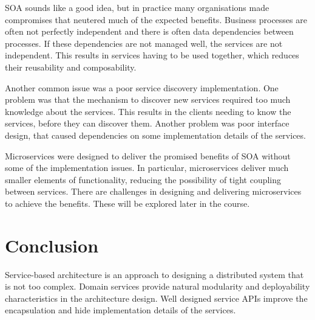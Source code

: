 SOA sounds like a good idea, but in practice many organisations made compromises that neutered much of the expected benefits.
Business processes are often not perfectly independent and there is often data dependencies between processes.
If these dependencies are not managed well, the services are not independent.
This results in services having to be used together, which reduces their reusability and composability.

Another common issue was a poor service discovery implementation.
One problem was that the mechanism to discover new services required too much knowledge about the services.
This results in the clients needing to know the services, before they can discover them.
Another problem was poor interface design, that caused dependencies on some implementation details of the services.

Microservices were designed to deliver the promised benefits of SOA without some of the implementation issues.
In particular, microservices deliver much smaller elements of functionality, reducing the possibility of tight coupling between services.
There are challenges in designing and delivering microservices to achieve the benefits.
These will be explored later in the course.


\section{Conclusion}

Service-based architecture is an approach to designing a distributed system that is not too complex.
Domain services provide natural modularity and deployability characteristics in the architecture design.
Well designed service APIs improve the encapsulation and hide implementation details of the services.
